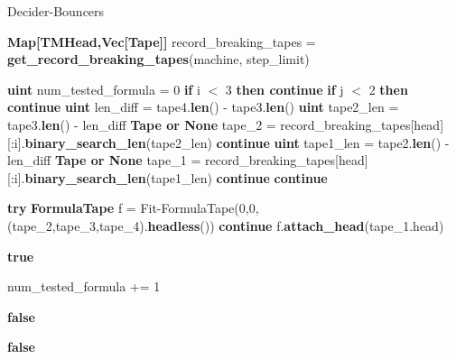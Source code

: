 \begin{algorithm}[h!]
    \caption{{\sc Decider-Bouncers}}\label{alg:decider-bouncers}
    \begin{algorithmic}[1]


        \State \textbf{Map[TMHead,Vec[Tape]]} record\_breaking\_tapes = \textbf{get\_record\_breaking\_tapes}(machine, step\_limit)

        \State \textbf{uint} num\_tested\_formula = 0
        \State \textbf{if} i $<$ 3 \textbf{then continue}
        \State \textbf{if} j $<$ 2 \textbf{then continue}
        \State \textbf{uint} len\_diff = tape4.\textbf{len}() - tape3.\textbf{len}()
        \State \textbf{uint} tape2\_len = tape3.\textbf{len}() - len\_diff
        \State \textbf{Tape or None} tape\_2 = record\_breaking\_tapes[head][:i].\textbf{binary\_search\_len}(tape2\_len)
        \State \textbf{continue}
        \EndIf
        \State
        \State \textbf{uint} tape1\_len = tape2.\textbf{len}() - len\_diff
        \State \textbf{Tape or None} tape\_1 = record\_breaking\_tapes[head][:i].\textbf{binary\_search\_len}(tape1\_len)
        \State \textbf{continue}
        \EndIf
        \State
        \State \textbf{continue}
        \EndIf

        \State

        \State \textbf{try} \textbf{FormulaTape} f = {\sc Fit-FormulaTape}(0,0,(tape\_2,tape\_3,tape\_4).\textbf{headless}())
        \State \textbf{continue}
        \EndIf
        \State
        \State f.\textbf{attach\_head}(tape\_1.head)

        \State \Return \textbf{true}

        \EndIf

        \State
        \State num\_tested\_formula += 1

        \State
        \State \Return \textbf{false}
        \EndIf


        \EndFor
        \EndFor
        \EndFor
        \State \Return \textbf{false}
        \EndProcedure
    \end{algorithmic}
\end{algorithm}

